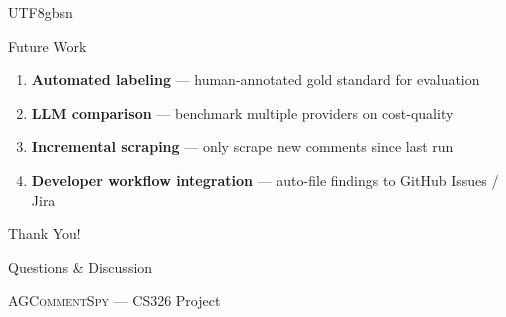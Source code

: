 \documentclass[11pt,aspectratio=169]{beamer}
\newenvironment{benumerate}
  {\setcounter{enumi}{0}\begin{enumerate}}
  {\end{enumerate}}
\begin{document}
\begin{CJK*}{UTF8}{gbsn}
\begin{frame}{Future Work}
  \begin{benumerate}
    \item \textbf{Automated labeling} --- human-annotated gold standard for evaluation
    \item \textbf{LLM comparison} --- benchmark multiple providers on cost-quality
    \item \textbf{Incremental scraping} --- only scrape new comments since last run
    \item \textbf{Developer workflow integration} --- auto-file findings to GitHub Issues / Jira
  \end{benumerate}
\end{frame}

\begin{frame}[plain]
  \begin{center}
    \Huge\color{myBlue} Thank You!

    \vspace{1cm}
    \normalsize\color{black}
    Questions \& Discussion

    \vspace{1.5cm}
    \small
    \textsc{AGCommentSpy} --- CS326 Project
  \end{center}
\end{frame}

\end{CJK*}
\end{document}
